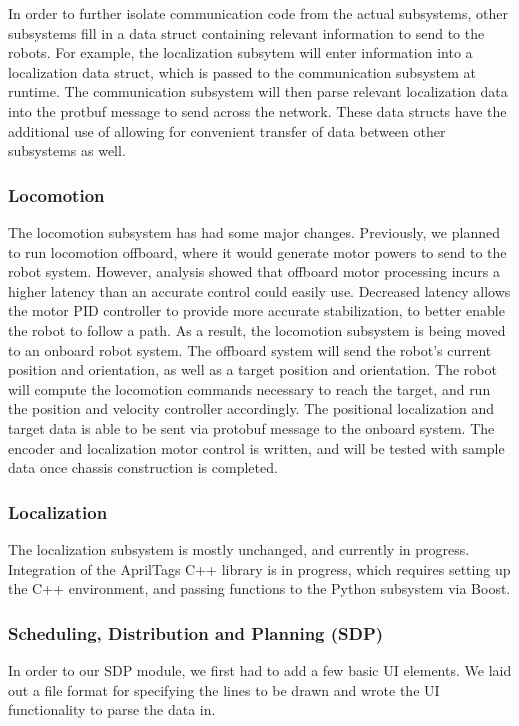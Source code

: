 In order to further isolate communication code from the actual subsystems, other subsystems fill in a data struct containing relevant information to send to the robots. For example, the localization subsytem will enter information into a localization data struct, which is passed to the communication subsystem at runtime. The communication subsystem will then parse relevant localization data into the protbuf message to send across the network. These data structs have the additional use of allowing for convenient transfer of data between other subsystems as well.

\subsubsection{Locomotion}
The locomotion subsystem has had some major changes. Previously, we planned to run locomotion offboard, where it would generate motor powers to send to the robot system. However, analysis showed that offboard motor processing incurs a higher latency than an accurate control could easily use. Decreased latency allows the motor PID controller to provide more accurate stabilization, to better enable the robot to follow a path. As a result, the locomotion subsystem is being moved to an onboard robot system. The offboard system will send the robot's current position and orientation, as well as a target position and orientation. The robot will compute the locomotion commands necessary to reach the target, and run the position and velocity controller accordingly. The positional localization and target data is able to be sent via protobuf message to the onboard system. The encoder and localization motor control is written, and will be tested with sample data once chassis construction is completed.

\subsubsection{Localization}
The localization subsystem is mostly unchanged, and currently in progress. Integration of the AprilTags C++ library is in progress, which requires setting up the C++ environment, and passing functions to the Python subsystem via Boost.

\subsubsection{Scheduling, Distribution and Planning (SDP)}

In order to our SDP module, we first had to add a few basic UI elements. We laid out a file format for specifying the lines to be drawn and wrote the UI functionality to parse the data in.

